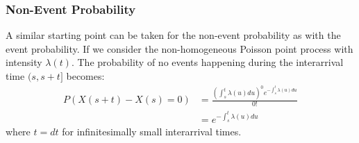 \subsubsection{Non-Event Probability}
\label{sec:Method:Possion:NonEventProbability}
A similar starting point can be taken for the non-event probability as with the event probability.
If we consider the non-homogeneous Poisson point process with intensity $\lambda(t)$. The probability of no events happening during the interarrival time $(s, s+t]$ becomes:
\begin{align}
P(X(s+t) - X(s) = 0) &= \frac{\left(\int_s^t \lambda(u)du \right)^0 e^{- \int_s^t \lambda(u)du}}{0!}\\
&= e^{- \int_s^t \lambda(u)du}
\end{align}
where $t = dt$ for infinitesimally small interarrival times.
